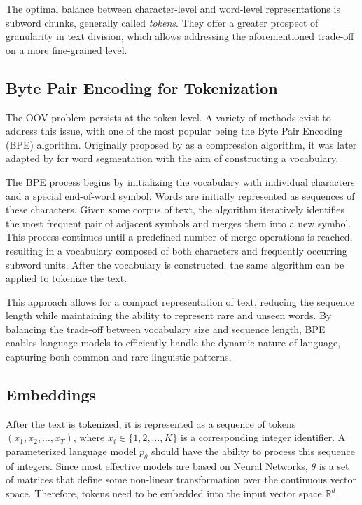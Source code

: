 The optimal balance between character-level and word-level representations is subword chunks, generally called \textit{tokens}. They offer a greater prospect of granularity in text division, which allows addressing the aforementioned trade-off on a more fine-grained level.

\subsection{Byte Pair Encoding for Tokenization}

The OOV problem persists at the token level. A variety of methods exist to address this issue, with one of the most popular being the Byte Pair Encoding (BPE) algorithm. Originally proposed by \citet{gage1994} as a compression algorithm, it was later adapted by \citet{sennrich2015} for word segmentation with the aim of constructing a vocabulary.

The BPE process begins by initializing the vocabulary with individual characters and a special end-of-word symbol. Words are initially represented as sequences of these characters. Given some corpus of text, the algorithm iteratively identifies the most frequent pair of adjacent symbols and merges them into a new symbol. This process continues until a predefined number of merge operations is reached, resulting in a vocabulary composed of both characters and frequently occurring subword units. After the vocabulary is constructed, the same algorithm can be applied to tokenize the text.

This approach allows for a compact representation of text, reducing the sequence length while maintaining the ability to represent rare and unseen words. By balancing the trade-off between vocabulary size and sequence length, BPE enables language models to efficiently handle the dynamic nature of language, capturing both common and rare linguistic patterns.

\subsection{Embeddings}\label{sec:embeddings}

\begin{sloppypar}
After the text is tokenized, it is represented as a sequence of tokens \((x_1, x_2, \ldots, x_T)\), where \(x_i \in \{1, 2, \ldots, K\}\) is a corresponding integer identifier. A parameterized language model \(p_\theta\) should have the ability to process this sequence of integers. Since most effective models are based on Neural Networks, \(\theta\) is a set of matrices that define some non-linear transformation over the continuous vector space. Therefore, tokens need to be embedded into the input vector space \(\mathbb{R}^d\).
\end{sloppypar}

